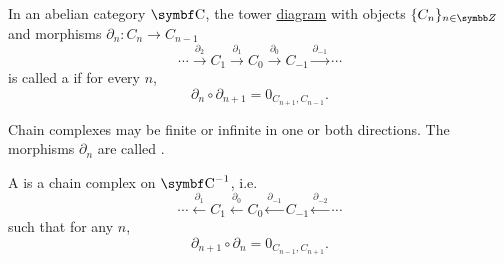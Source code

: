 \begin{Definition}\label{def:chain_complex}\cite{nLab:chain_complex}
  In an abelian category \( \Cat{C} \), the tower \hyperref[def:tower_diagram]{diagram} with objects \( \{ C_n \}_{n \in \BZ} \) and morphisms \( \partial_n: C_n \to C_{n-1} \)
  \begin{equation}\label{def:chain_complex/chain_diagram}
    \cdots
    \overset {\partial_2} \longrightarrow
    C_1
    \overset {\partial_1} \longrightarrow
    C_0
    \overset {\partial_0} \longrightarrow
    C_{-1}
    \overset {\partial_{-1}} \longrightarrow
    \cdots
  \end{equation}
  is called a  if for every \( n \),
  \begin{equation*}
    \partial_n \circ \partial_{n+1} = 0_{C_{n+1},C_{n-1}}.
  \end{equation*}

  Chain complexes may be finite or infinite in one or both directions. The morphisms \( \partial_n \) are called .

  A  is a chain complex on \( \Cat{C}^{-1} \), i.e.
  \begin{equation}\label{def:chain_complex/cochain_diagram}
    \cdots
    \overset {\partial_1} \longleftarrow
    C_1
    \overset {\partial_0} \longleftarrow
    C_0
    \overset {\partial_{-1}} \longleftarrow
    C_{-1}
    \overset {\partial_{-2}} \longleftarrow
    \cdots
  \end{equation}
  such that for any \( n \),
  \begin{equation*}
    \partial_{n+1} \circ \partial_n = 0_{C_{n-1},C_{n+1}}.
  \end{equation*}
\end{Definition}
